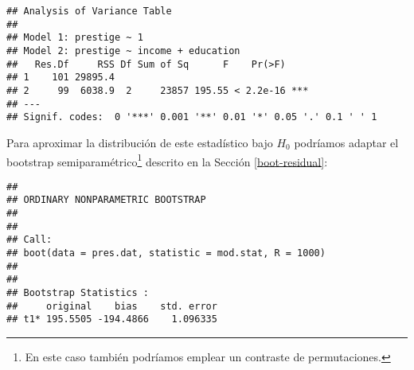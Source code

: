 \documentclass[
]{book}
\newenvironment{Shaded}{\begin{snugshade}}{\end{snugshade}}
\newcommand{\AttributeTok}[1]{\textcolor[rgb]{0.77,0.63,0.00}{#1}}
\newcommand{\CommentTok}[1]{\textcolor[rgb]{0.56,0.35,0.01}{\textit{#1}}}
\newcommand{\ControlFlowTok}[1]{\textcolor[rgb]{0.13,0.29,0.53}{\textbf{#1}}}
\newcommand{\DecValTok}[1]{\textcolor[rgb]{0.00,0.00,0.81}{#1}}
\newcommand{\FunctionTok}[1]{\textcolor[rgb]{0.00,0.00,0.00}{#1}}
\newcommand{\NormalTok}[1]{#1}
\newcommand{\OtherTok}[1]{\textcolor[rgb]{0.56,0.35,0.01}{#1}}
\newcommand{\SpecialCharTok}[1]{\textcolor[rgb]{0.00,0.00,0.00}{#1}}
\theoremstyle{break}
\theoremstyle{definition}
\theoremstyle{definition}
\theoremstyle{definition}
\theoremstyle{definition}
\theoremstyle{remark}
\begin{document}
\begin{verbatim}
## Analysis of Variance Table
## 
## Model 1: prestige ~ 1
## Model 2: prestige ~ income + education
##   Res.Df     RSS Df Sum of Sq      F    Pr(>F)    
## 1    101 29895.4                                  
## 2     99  6038.9  2     23857 195.55 < 2.2e-16 ***
## ---
## Signif. codes:  0 '***' 0.001 '**' 0.01 '*' 0.05 '.' 0.1 ' ' 1
\end{verbatim}

Para aproximar la distribución de este estadístico bajo \(H_0\) podríamos adaptar
el bootstrap semiparamétrico\footnote{En este caso también podríamos emplear un contraste
  de permutaciones.} descrito en la Sección \ref{boot-residual}:

\begin{Shaded}
\end{Shaded}

\begin{verbatim}
## 
## ORDINARY NONPARAMETRIC BOOTSTRAP
## 
## 
## Call:
## boot(data = pres.dat, statistic = mod.stat, R = 1000)
## 
## 
## Bootstrap Statistics :
##     original    bias    std. error
## t1* 195.5505 -194.4866    1.096335
\end{verbatim}
\end{document}
